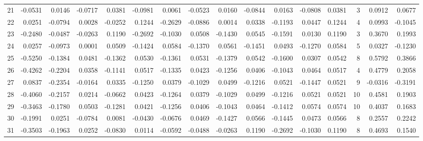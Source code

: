 \begin{tabular}{lrrrrrrrrrrrrrrr}
21  &     -0.0531 &  0.0146 & -0.0717 &  0.0381 & -0.0981 &  0.0061 & -0.0523 &  0.0160 & -0.0844 &  0.0163 &  -0.0808 &     0.0381 &      3 &                    0.0912 &                     0.0677 \\
22  &      0.0251 & -0.0794 &  0.0028 & -0.0252 &  0.1244 & -0.2629 & -0.0886 &  0.0014 &  0.0338 & -0.1193 &   0.0447 &     0.1244 &      4 &                    0.0993 &                    -0.1045 \\
23  &     -0.2480 & -0.0487 & -0.0263 &  0.1190 & -0.2692 & -0.1030 &  0.0508 & -0.1430 &  0.0545 & -0.1591 &   0.0130 &     0.1190 &      3 &                    0.3670 &                     0.1993 \\
24  &      0.0257 & -0.0973 &  0.0001 &  0.0509 & -0.1424 &  0.0584 & -0.1370 &  0.0561 & -0.1451 &  0.0493 &  -0.1270 &     0.0584 &      5 &                    0.0327 &                    -0.1230 \\
25  &     -0.5250 & -0.1384 &  0.0481 & -0.1362 &  0.0530 & -0.1361 &  0.0531 & -0.1379 &  0.0542 & -0.1600 &   0.0307 &     0.0542 &      8 &                    0.5792 &                     0.3866 \\
26  &     -0.4262 & -0.2204 &  0.0358 & -0.1141 &  0.0517 & -0.1335 &  0.0423 & -0.1256 &  0.0406 & -0.1043 &   0.0464 &     0.0517 &      4 &                    0.4779 &                     0.2058 \\
27  &      0.0837 & -0.2354 & -0.0164 &  0.0335 & -0.1250 &  0.0379 & -0.1029 &  0.0499 & -0.1216 &  0.0521 &  -0.1447 &     0.0521 &      9 &                   -0.0316 &                    -0.3191 \\
28  &     -0.4060 & -0.2157 &  0.0214 & -0.0662 &  0.0423 & -0.1264 &  0.0379 & -0.1029 &  0.0499 & -0.1216 &   0.0521 &     0.0521 &     10 &                    0.4581 &                     0.1903 \\
29  &     -0.3463 & -0.1780 &  0.0503 & -0.1281 &  0.0421 & -0.1256 &  0.0406 & -0.1043 &  0.0464 & -0.1412 &   0.0574 &     0.0574 &     10 &                    0.4037 &                     0.1683 \\
30  &     -0.1991 &  0.0251 & -0.0784 &  0.0081 & -0.0430 & -0.0676 &  0.0469 & -0.1427 &  0.0566 & -0.1445 &   0.0473 &     0.0566 &      8 &                    0.2557 &                     0.2242 \\
31  &     -0.3503 & -0.1963 &  0.0252 & -0.0830 &  0.0114 & -0.0592 & -0.0488 & -0.0263 &  0.1190 & -0.2692 &  -0.1030 &     0.1190 &      8 &                    0.4693 &                     0.1540 \\

\end{tabular}
